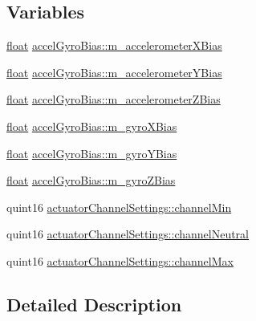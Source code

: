 \subsection*{Variables}
\begin{DoxyCompactItemize}
\item 
\hyperlink{_super_l_u_support_8h_a6a1bb6ed41f44b60e7bd83b0e9945aa7}{float} \hyperlink{group___vehicle_configuration_source_ga982c33b20f567fe289dd461ce9bb0df2}{accel\-Gyro\-Bias\-::m\-\_\-accelerometer\-X\-Bias}
\item 
\hyperlink{_super_l_u_support_8h_a6a1bb6ed41f44b60e7bd83b0e9945aa7}{float} \hyperlink{group___vehicle_configuration_source_ga76b3af5f8c4f87a92045a698eb32c681}{accel\-Gyro\-Bias\-::m\-\_\-accelerometer\-Y\-Bias}
\item 
\hyperlink{_super_l_u_support_8h_a6a1bb6ed41f44b60e7bd83b0e9945aa7}{float} \hyperlink{group___vehicle_configuration_source_gaa0475cba1c09df9c39a69bbb62711b8e}{accel\-Gyro\-Bias\-::m\-\_\-accelerometer\-Z\-Bias}
\item 
\hyperlink{_super_l_u_support_8h_a6a1bb6ed41f44b60e7bd83b0e9945aa7}{float} \hyperlink{group___vehicle_configuration_source_ga483a0631083ce446a08b73ecc712ed73}{accel\-Gyro\-Bias\-::m\-\_\-gyro\-X\-Bias}
\item 
\hyperlink{_super_l_u_support_8h_a6a1bb6ed41f44b60e7bd83b0e9945aa7}{float} \hyperlink{group___vehicle_configuration_source_gade8f76b5b608f6446cb182c372598e53}{accel\-Gyro\-Bias\-::m\-\_\-gyro\-Y\-Bias}
\item 
\hyperlink{_super_l_u_support_8h_a6a1bb6ed41f44b60e7bd83b0e9945aa7}{float} \hyperlink{group___vehicle_configuration_source_ga637101f3cecb351e7fe8d6106dd50d15}{accel\-Gyro\-Bias\-::m\-\_\-gyro\-Z\-Bias}
\item 
quint16 \hyperlink{group___vehicle_configuration_source_ga51bfc85e00becd45e4e622da70ff9d27}{actuator\-Channel\-Settings\-::channel\-Min}
\item 
quint16 \hyperlink{group___vehicle_configuration_source_gac557d0adca6e1ec8f789659c32cfbeff}{actuator\-Channel\-Settings\-::channel\-Neutral}
\item 
quint16 \hyperlink{group___vehicle_configuration_source_ga204a4e4648453d51e42ad2b82cb68fa8}{actuator\-Channel\-Settings\-::channel\-Max}
\end{DoxyCompactItemize}


\subsection{Detailed Description}


